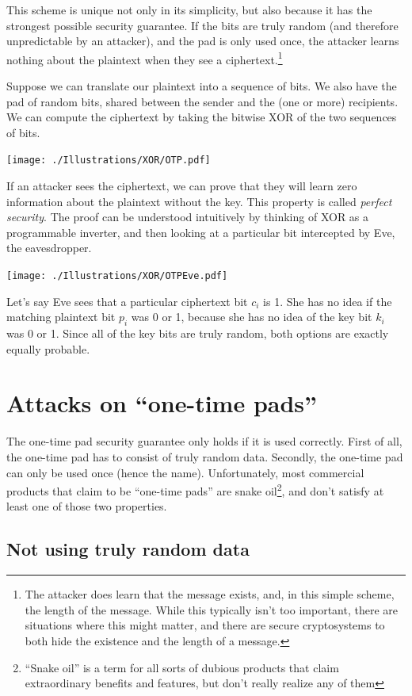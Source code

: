 \documentclass[11pt,ebook,table,dvipsnames]{memoir}
\begin{document}
 This scheme is unique not only in its simplicity, but also because it
has the strongest possible security guarantee. If the bits are truly
random (and therefore unpredictable by an attacker), and the pad is
only used once, the attacker learns nothing about the plaintext when
they see a ciphertext.\footnote{The attacker does learn that the message
exists, and, in this simple scheme, the length of the message. While
this typically isn't too important, there are situations where this
might matter, and there are secure cryptosystems to both hide the
existence and the length of a message.}

Suppose we can translate our plaintext into a sequence of bits. We
also have the pad of random bits, shared between the sender and the
(one or more) recipients. We can compute the ciphertext by taking the
bitwise XOR of the two sequences of bits.

\texttt{[image: ./Illustrations/XOR/OTP.pdf]}

If an attacker sees the ciphertext, we can prove that they will learn
zero information about the plaintext without the key. This property is
called \emph{perfect security}. The proof can be understood intuitively by
thinking of XOR as a programmable inverter, and then looking at a
particular bit intercepted by Eve, the eavesdropper.

\texttt{[image: ./Illustrations/XOR/OTPEve.pdf]}

Let's say Eve sees that a particular ciphertext bit $c_i$ is 1. She
has no idea if the matching plaintext bit $p_i$ was 0 or 1, because
she has no idea of the key bit $k_i$ was 0 or 1. Since all of the key
bits are truly random, both options are exactly equally probable.
\section{Attacks on \enquote{one-time pads}}
\label{sec-2-1-5}

The one-time pad security guarantee only holds if it is used
correctly. First of all, the one-time pad has to consist of truly
random data. Secondly, the one-time pad can only be used once (hence
the name). Unfortunately, most commercial products that claim to be
\enquote{one-time pads} are snake oil\footnote{\enquote{Snake oil} is a term for all sorts
of dubious products that claim extraordinary benefits and features,
but don't really realize any of them}, and don't satisfy at least one
of those two properties.

\subsection{Not using truly random data}
\label{sec-2-1-5-1}
\end{document}
